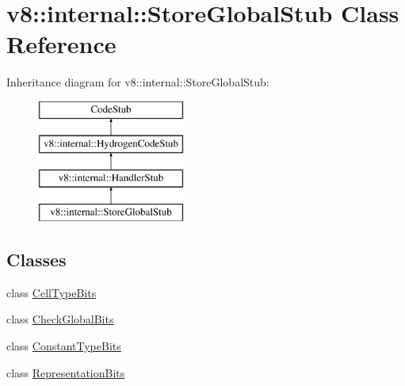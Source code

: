\hypertarget{classv8_1_1internal_1_1_store_global_stub}{}\section{v8\+:\+:internal\+:\+:Store\+Global\+Stub Class Reference}
\label{classv8_1_1internal_1_1_store_global_stub}
Inheritance diagram for v8\+:\+:internal\+:\+:Store\+Global\+Stub\+:\begin{figure}[H]
\begin{center}
\leavevmode
\includegraphics[height=4.000000cm]{classv8_1_1internal_1_1_store_global_stub}
\end{center}
\end{figure}
\subsection*{Classes}
\begin{DoxyCompactItemize}
\item 
class \hyperlink{classv8_1_1internal_1_1_store_global_stub_1_1_cell_type_bits}{Cell\+Type\+Bits}
\item 
class \hyperlink{classv8_1_1internal_1_1_store_global_stub_1_1_check_global_bits}{Check\+Global\+Bits}
\item 
class \hyperlink{classv8_1_1internal_1_1_store_global_stub_1_1_constant_type_bits}{Constant\+Type\+Bits}
\item 
class \hyperlink{classv8_1_1internal_1_1_store_global_stub_1_1_representation_bits}{Representation\+Bits}
\end{DoxyCompactItemize}
